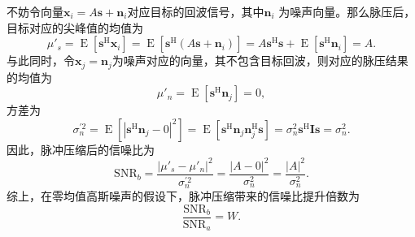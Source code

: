 \begin{solution}
    不妨令向量\( \bm{x}_i = A \bm{s} + \bm{n}_i \)对应目标的回波信号，其中\(\bm{n}_i\) 为噪声向量。那么脉压后，目标对应的尖峰值的均值为
    \[
        \mu'_s = \operatorname{E}[\bm{s}^{\mathrm{H}} \bm{x}_i] = \operatorname{E}[\bm{s}^{\mathrm{H}} (A \bm{s} + \bm{n}_i)] = A \bm{s}^{\mathrm{H}} \bm{s} + \operatorname{E}[\bm{s}^{\mathrm{H}} \bm{n}_i] = A.
    \]
    与此同时，令\( \bm{x}_j = \bm{n}_j \)为噪声对应的向量，其不包含目标回波，则对应的脉压结果的均值为
    \[
        \mu'_n = \operatorname{E}[\bm{s}^{\mathrm{H}} \bm{n}_j] = 0,
    \]
    方差为
    \[
        \sigma_n^{'2} = \operatorname{E}[|\bm{s}^{\mathrm{H}} \bm{n}_j - 0|^2] = \operatorname{E}[\bm{s}^{\mathrm{H}} \bm{n}_j \bm{n}_j^{\mathrm{H}} \bm{s}] = \sigma^2_n \bm{s}^{\mathrm{H}} \mathbf{I} \bm{s} = \sigma^2_n.
    \]
    因此，脉冲压缩后的信噪比为
    \[
        \mathrm{SNR}_{b} = \frac{|\mu'_s - \mu'_n|^2}{\sigma_n^{'2}} =\frac{|A-0|^2}{\sigma^2_n} = \frac{|A|^2}{\sigma^2_n}.
    \]
    综上，在零均值高斯噪声的假设下，脉冲压缩带来的信噪比提升倍数为
    \[
        \frac{\mathrm{SNR}_{b}}{\mathrm{SNR}_{a}} = W.
    \]
\end{solution}


